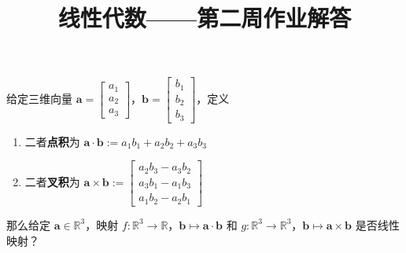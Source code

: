 

\title{\textbf{线性代数——第二周作业解答}}

	\maketitle
	
	\iffalse week 2
	练习 1.1.10
	练习 1.1.11
	练习 1.2.1
	练习 1.2.2(6,7,8,9,10)
	练习 1.2.3
	练习 1.2.5(2,3,4,5)
	练习 1.2.7
	\fi
	
	\begin{exercise}[1.1.10]
		给定三维向量 $\boldsymbol{a}=\begin{bmatrix}
			a_1\\a_2\\a_3
		\end{bmatrix}$，$\boldsymbol{b}=\begin{bmatrix}
			b_1\\b_2\\b_3
		\end{bmatrix}$，定义
		\begin{enumerate}
			\item 二者\textbf{点积}为 $\boldsymbol{a\cdot b}:=a_1b_1+a_2b_2+a_3b_3$
			\item 二者\textbf{叉积}为 $\boldsymbol{a\times b}:=\begin{bmatrix}
				a_2b_3-a_3b_2\\
				a_3b_1-a_1b_3\\
				a_1b_2-a_2b_1
			\end{bmatrix}$
		\end{enumerate}
		那么给定 $\boldsymbol{a}\in\mathbb{R}^3$，映射 $f:\mathbb{R}^3\rightarrow\mathbb{R}$，$\boldsymbol{b}\mapsto\boldsymbol{a\cdot b}$ 和 $g:\mathbb{R}^3\rightarrow\mathbb{R}^3$，$\boldsymbol{b}\mapsto\boldsymbol{a\times b}$ 是否线性映射？
	\end{exercise}
